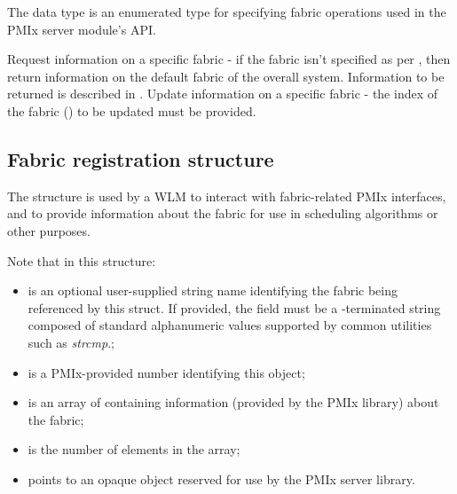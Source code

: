 The  data type is an enumerated type for specifying fabric operations used in the \ac{PMIx} server module's  \ac{API}.

\begin{constantdesc}
%
Request information on a specific fabric - if the fabric isn't specified as per , then return information on the default fabric of the overall system. Information to be returned is described in .
%
Update information on a specific fabric - the index of the fabric () to be updated must be provided.
%
\end{constantdesc}

\subsection{Fabric registration structure}

The  structure is used by a \ac{WLM} to interact with fabric-related \ac{PMIx} interfaces, and to provide information about the fabric for use in scheduling algorithms or other purposes.


Note that in this structure:

\begin{itemize}
    \item {} is an optional user-supplied string name identifying the fabric being referenced by this struct. If provided, the field must be a -terminated string composed of standard alphanumeric values supported by common utilities such as \textit{strcmp}.;
    \item {} is a \ac{PMIx}-provided number identifying this object;
    \item {} is an array of  containing information (provided by the \ac{PMIx} library) about the fabric;
    \item {} is the number of elements in the  array;
    \item {} points to an opaque object reserved for use by the \ac{PMIx} server library.
\end{itemize}

